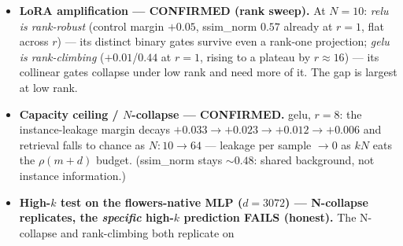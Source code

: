\documentclass[11pt]{article}
\newcommand{\rank}{\operatorname{rank}}
\newcommand{\col}{\operatorname{col}}
\newcommand{\row}{\operatorname{row}}
\begin{document}
\begin{itemize}
  \emph{single-sample} gradient) $\gg$ softplus\_b50 $0.773 >$ relu $0.750 >$ gelu $0.685 >$ silu $0.664$.
  The \emph{same} collinearity that makes softplus the \emph{worst} for direct inversion
  ($\text{cos}_M=0.997$, $\rank(M)\approx1$: entangled samples, least leakage) makes its gradient the
  \emph{most decodable} by the bridge. \textbf{The two attacks have opposite activation preferences} ---
  and GELU (the deployment C$^\infty$ unit) is the \emph{least} decodable, so the bridge is hardest on
  the deployment-realistic activation. \textbf{End-to-end (GB-Phase 2): single-sided FAILS, two-sided
  RECOVERS (partial).} The inverter needs the \emph{input}-layer gradient
  ($\partial L/\partial W_0 = g_{\mathrm{err}}\,x^\top$; corrupting the hidden layer to cos $0.64$ leaves
  extraction at ssim $0.98$, corrupting the input layer to $0.64$ drops it to $0.52$), so the bridge's
  $0.997$ \emph{hidden} decode is useless. The input layer decodes only to $0.637$ single-sided --- but
  $x$ is the \emph{row} factor of $g_{\mathrm{err}}\,x^\top$, and single-sided observes only $\col(B_0)$;
  a \textbf{two-sided} (nonzero-$A_0$) measurement observes $\row(A_0)$ where $x$ lives and lifts the
  decode to $0.912$ and image cosine to $0.90$ (raising rank does not help). So the bridge \emph{can}
  recover images with the right measurement channel --- a coarse/low-frequency recovery (SSIM
  $\approx0.15$: recognisable but blurry), not the pixel-perfect direct-inversion result.
  \item \textbf{LoRA amplification --- CONFIRMED (rank sweep).} At $N{=}10$: \emph{relu is rank-robust}
  (control margin $+0.05$, ssim\_norm $0.57$ already at $r{=}1$, flat across $r$) --- its distinct
  binary gates survive even a rank-one projection; \emph{gelu is rank-climbing} ($+0.01$/$0.44$ at
  $r{=}1$, rising to a plateau by $r\!\approx\!16$) --- its collinear gates collapse under low rank and
  need more of it. The gap is largest at low rank.
  \item \textbf{Capacity ceiling / $N$-collapse --- CONFIRMED.} gelu, $r{=}8$: the instance-leakage
  margin decays $+0.033\to+0.023\to+0.012\to+0.006$ and retrieval falls to chance as $N:10\to64$ ---
  leakage per sample $\to0$ as $kN$ eats the $\rho(m+d)$ budget. (ssim\_norm stays $\sim0.48$: shared
  background, not instance information.)
  \item \textbf{High-$k$ test on the flowers-native MLP ($d{=}3072$) --- N-collapse replicates, the
  \emph{specific} high-$k$ prediction FAILS (honest).} The N-collapse and rank-climbing both replicate on

\end{itemize}
\end{document}
